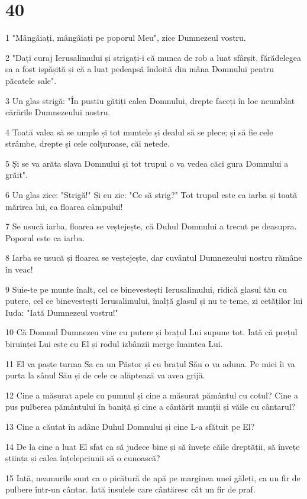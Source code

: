 \chapter{40}

\par 1 "Mângâiați, mângâiați pe poporul Meu", zice Dumnezeul vostru.
\par 2 "Dați curaj Ierusalimului și strigați-i că munca de rob a luat sfârșit, fărădelegea sa a fost ispășită și că a luat pedeapsă îndoită din mâna Domnului pentru păcatele sale".
\par 3 Un glas strigă: "În pustiu gătiți calea Domnului, drepte faceți în loc neumblat cărările Dumnezeului nostru.
\par 4 Toată valea să se umple și tot muntele și dealul să se plece; și să fie cele strâmbe, drepte și cele colțuroase, căi netede.
\par 5 Și se va arăta slava Domnului și tot trupul o va vedea căci gura Domnului a grăit".
\par 6 Un glas zice: "Strigă!" Și eu zic: "Ce să strig?" Tot trupul este ca iarba și toată mărirea lui, ca floarea câmpului!
\par 7 Se usucă iarba, floarea se veștejește, că Duhul Domnului a trecut pe deasupra. Poporul este ca iarba.
\par 8 Iarba se usucă și floarea se veștejește, dar cuvântul Dumnezeului nostru rămâne în veac!
\par 9 Suie-te pe munte înalt, cel ce binevestești Ierusalimului, ridică glasul tău cu putere, cel ce binevestești Ierusalimului, înalță glasul și nu te teme, zi cetăților lui Iuda: "Iată Dumnezeul vostru!"
\par 10 Că Domnul Dumnezeu vine cu putere și brațul Lui supune tot. Iată că prețul biruinței Lui este cu El și rodul izbânzii merge înaintea Lui.
\par 11 El va paște turma Sa ca un Păstor și cu brațul Său o va aduna. Pe miei îi va purta la sânul Său și de cele ce alăptează va avea grijă.
\par 12 Cine a măsurat apele cu pumnul și cine a măsurat pământul cu cotul? Cine a pus pulberea pământului în baniță și cine a cântărit munții și văile cu cântarul?
\par 13 Cine a căutat în adânc Duhul Domnului și cine L-a sfătuit pe El?
\par 14 De la cine a luat El sfat ca să judece bine și să învețe căile dreptății, să învețe știința și calea înțelepciunii să o cunoască?
\par 15 Iată, neamurile sunt ca o picătură de apă pe marginea unei găleți, ca un fir de pulbere într-un cântar. Iată insulele care cântăresc cât un fir de praf.
